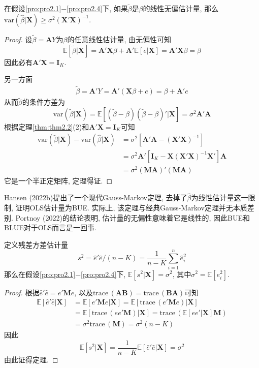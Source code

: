 \documentclass[cn, 12pt, math=mtpro2, bibstyle=apa, blue, twocol]{elegantbook}
\newcommand{\E}{\mathbb{E}}
\newcommand{\var}{\text{var}}
\newcommand{\X}{\mathbold{X}}
\newcommand{\hb}{\hat{\beta}}
\newcommand{\M}{\mathbold{M}}
\begin{document}
\begin{theorem}\label{thm:thm2.7}
  在假设\ref{pro:pro2.1}$-$\ref{pro:pro2.4}下, 如果$\tilde{\beta}$是$\beta$的线性无偏估计量, 那么$\var(\hb|\X)\geq\sigma^2(\X'\X)^{-1}$.
\end{theorem}
\begin{proof}
  设$\tilde{\beta}=\mathbold{A}Y$为$\beta$的任意线性估计量, 由无偏性可知
  $$\E[\tilde{\beta}|\X]=\mathbold{A}'\X\beta+\mathbold{A}'\E[e|\X]=\mathbold{A}'\X\beta=\beta$$
  因此必有$\mathbold{A}'\X=\mathbold{I}_K$.

  另一方面
  \begin{align*}
  \tilde{\beta}=\mathbold{A}'Y=\mathbold{A}'(\X\beta+e)=\beta+\mathbold{A}'e
  \end{align*}
  从而$\tilde{\beta}$的条件方差为
  $$\var(\tilde{\beta}|\X)=\E[(\tilde{\beta}-\beta)(\tilde{\beta}-\beta)'|\X]=\sigma^2\mathbold{A}'\mathbold{A}$$
  根据定理\ref{thm:thm2.2}(2)和$\mathbold{A}'\X=\mathbold{I}_K$可知
  \begin{align*}
  \var(\tilde{\beta}|\X)-\var(\hb|\X)&=\sigma^2[\mathbold{A}'\mathbold{A}-(\X'\X)^{-1}] \\
  &=\sigma^2\mathbold{A}'[\mathbold{I}_K-\X(\X'\X)^{-1}\X']\mathbold{A} \\
  &=\sigma^2(\mathbold{MA})'(\mathbold{MA})
  \end{align*}
  它是一个半正定矩阵, 定理得证.
\end{proof}
\begin{remark}
Hansen (2022b)提出了一个现代Gauss-Markov定理, 去掉了$\hat{\beta}$为线性估计量这一限制, 证明OLS估计量为BUE. 实际上, 该定理与经典Gauss-Markov定理并无本质差别. Portnoy (2022)的结论表明, 估计量的无偏性意味着它是线性的, 因此BUE和BLUE对于OLS而言是一回事.
\end{remark}

\begin{theorem}\label{thm:thm2.4}
  定义残差方差估计量
  $$s^2=\hat{e}'\hat{e}/(n-K)=\frac{1}{n-K}\sum_{i=1}^{n}\hat{e}_i^2$$
  那么在假设\ref{pro:pro2.1}$-$\ref{pro:pro2.4}下, $\E[s^2|\X]=\sigma^2$, 其中$\sigma^2=\E[e_i^2]$.
\end{theorem}
\begin{proof}
  根据$\hat{e}'\hat{e}=e'\mathbold{M}e$, 以及$\text{trace}\,(\mathbold{AB})=\text{trace}\,(\mathbold{BA})$可知
  \begin{align*}
  \E[\hat{e}'\hat{e}|\X]&=\E[e'\mathbold{M}e|\X]=\E[\text{trace}\,(e'\M e)|\X] \\
  &=\E[\text{trace}\,(ee'\M)|\X]=\text{trace}\,(\E[ee'|\X]\M) \\
  &=\sigma^2\text{trace}\,(\M)=\sigma^2(n-K)
  \end{align*}
  因此
  $$\E[s^2|\X]=\frac{1}{n-K}\E[\hat{e}'\hat{e}|\X]=\sigma^2$$
  由此证得定理.
\end{proof}
\end{document}
